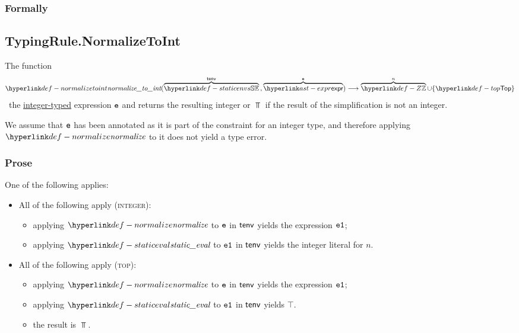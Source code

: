 \subsubsection{Formally}

\subsection{TypingRule.NormalizeToInt \label{sec:TypingRule.NormalizeToInt}}
\hypertarget{def-normalizetoint}{}
The function
\[
\normalizetoint(
  \overname{\staticenvs}{\tenv} \aslsep
  \overname{\expr}{\ve}
) \aslto \overname{\Z}{n} \cup \{\Top\}
\]
\symbolicallysimplifies\ the \underline{integer-typed} expression $\texttt{e}$ and returns the resulting integer or $\Top$ if
the result of the simplification is not an integer.

We assume that $\texttt{e}$ has been annotated as it is part of the constraint for an integer type,
and therefore applying $\normalize$ to it does not yield a type error.

\subsubsection{Prose}
One of the following applies:
\begin{itemize}
  \item All of the following apply (\textsc{integer}):
  \begin{itemize}
    \item applying $\normalize$ to $\texttt{e}$ in $\textsf{tenv}$ yields the expression $\texttt{e1}$;
    \item applying $\staticeval$ to $\texttt{e1}$ in $\textsf{tenv}$ yields the integer literal for $n$.
  \end{itemize}

  \item All of the following apply (\textsc{top}):
  \begin{itemize}
    \item applying $\normalize$ to $\texttt{e}$ in $\textsf{tenv}$ yields the expression $\texttt{e1}$;
    \item applying $\staticeval$ to $\texttt{e1}$ in $\textsf{tenv}$ yields $\top$.
    \item the result is $\Top$.
  \end{itemize}
\end{itemize}

